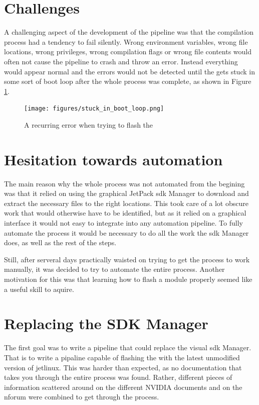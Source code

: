 \section{Challenges}
A challenging aspect of the development of the pipeline was that the compilation process had a tendency to fail silently.
Wrong environment variables, wrong file locations, wrong privileges, wrong compilation flags or wrong file contents would often not cause the pipeline to crash and throw an error.
Instead everything would appear normal and the errors would not be detected until the \jx gets stuck in some sort of boot loop after the whole process was complete, as shown in Figure \ref{fig:stuck_in_boot_loop}.

\begin{figure}[H]
    \centering
    \texttt{[image: figures/stuck\_in\_boot\_loop.png]}
    \caption{A recurring error when trying to flash the \jx}
    \label{fig:stuck_in_boot_loop}
\end{figure}

\section{Hesitation towards automation}
The main reason why the whole process was not automated from the begining was that it relied on using the graphical JetPack \gls{sdk} Manager to download and extract the necessary files to the right locations.
This took care of a lot obscure work that would otherwise have to be identified, but as it relied on a graphical interface it would not easy to integrate into any automation pipeline.
To fully automate the process it would be necessary to do all the work the \gls{sdk} Manager does, as well as the rest of the steps.

Still, after serveral days practically waisted on trying to get the process to work manually, it was decided to try to automate the entire process.
Another motivation for this was that learning how to flash a \jetson module properly seemed like a useful skill to aquire.

\section{Replacing the SDK Manager}
The first goal was to write a pipeline that could replace the visual \gls{sdk} Manager.
That is to write a pipaline capable of flashing the \jx with the latest unmodified version of \gls{jetlinux}.
This was harder than expected, as no documentation that takes you through the entire process was found.
Rather, different pieces of information scattered around on the different NVIDIA documents and on the \gls{nforum} were combined to get through the process.



